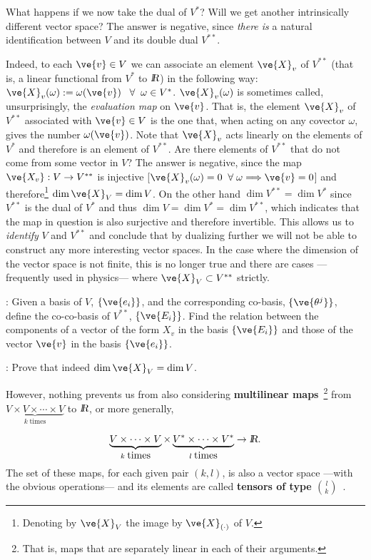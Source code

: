 What happens if we now take the dual of $V^*$? Will we get another intrinsically different vector space? The answer is negative, since \textit{there is} a natural identification
between $V$ and its double dual $V^{**}$.

Indeed, to each $\ve{v}\in V$ we can associate an element $\ve{
X}_v$ of
$V^{**}$ (that is, a linear functional from $V^*$ to $\mbox{\sl {l$\!\!\!\;\:\!$R}}$) in the
following way: $\ve{X}_v(\omega):=\omega(\ve{v}) \;\;\;\forall
\;\;\omega\in V^{*}$. $\ve{X}_v(\omega)$ is sometimes called, unsurprisingly, the \textit{evaluation map} on $\ve{v}$. That is, the element $\ve{X}_v$ of $V^{**}$
associated with $\ve{ v}\in V$ is the one that, when acting on any
covector $\omega$, gives the number $\omega (\ve{v})$. Note that $\ve{X}_v$ acts
linearly on the elements of $V^*$ and therefore is an element
of $V^{**}$. Are there elements of $V^{**}$ that do not come from some
vector in $V$? The answer is negative, since the map  $\ve{X_v}:V\to V^{**}$ is
injective [$\ve{X}_v(\omega)=0\;\;\forall \; \omega\Longrightarrow \ve{v}=0$] and
therefore\footnote{Denoting by $\ve{X}_V$ the image by $\ve{X}_{(\cdot)}$ 
of $V$.} $\dim \ve{X}_V = \dim V$.
On the other hand $\dim V^{**} = \dim V^*$ since $V^{**}$ is the dual of $V^*$ and thus 
$\dim V = \dim V^* = \dim V^{**}$, which indicates that the map in question is also 
surjective and therefore invertible.
This allows us to \textit{identify}
$V$ and $V^{**}$ and conclude that by dualizing further we will not be able
to construct any more interesting vector spaces. In the case where the dimension of the vector space is not finite, this is no longer true and there are cases ---frequently used in physics--- where $\ve{X}_V \subset V^{**}$ strictly.
\espa

\ejer: Given a basis of $V$, $\{\ve{e_{i}}\}$, and the corresponding co-basis, $\{\ve{\theta^{j}}\}$, define the co-co-basis of $V^{**}$, $\{\ve{E_{i}}\}$. 
Find the relation between the components of a vector of the form $X_{v}$ in the basis $\{\ve{E_{i}}\}$ and 
those of the vector $\ve{v}$ in the basis $\{\ve{e_{i}}\}$.

\ejer: Prove that indeed $\dim \ve{X}_V = \dim V$.

However, nothing prevents us from also considering 
{\bf multilinear maps}~\footnote{That is, maps that are separately linear in each 
of their arguments.} 
from $\underbrace{V\times V\times\cdots\times V}_{k\;\mbox{times}}$ to $\mbox{\sl {l$\!\!\!\;\:\!$R}}$,
or more generally,

\[
\underbrace{V\times\cdots\times V}_{k\;\mbox{times}}
\times\underbrace{ V^*\times \cdots\times V^*}_{l\;\mbox{times}} \to \mbox{\sl {l$\!\!\!\;\:\!$R}}.
\]
%
The set of these maps, for each given pair $(k,l)$, is also a vector 
space ---with the obvious operations--- and its elements are called
{\bf tensors of type ${l\choose k}$}~.

